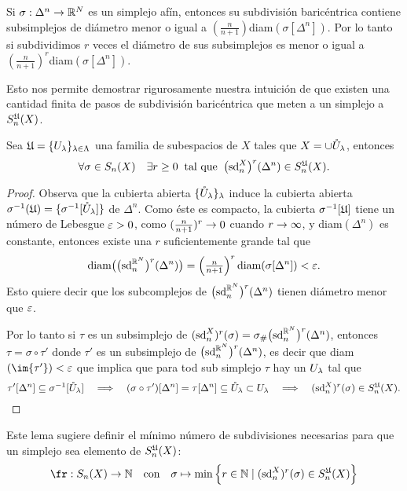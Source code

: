 \documentclass[../../topologia_algebraica]{subfiles}
\begin{document}
Si $\sigma:\Delta^n\rightarrow\mathbb{R}^N$ es un simplejo af\'in, entonces su subdivisi\'on baric\'entrica
contiene subsimplejos de di\'ametro menor o igual a $(\tfrac{n}{n+1})$diam$(\sigma[\Delta^n])$.
Por lo tanto si subdividimos $r$ veces el di\'ametro de sus subsimplejos es menor o igual
a $(\tfrac{n}{n+1})^r$diam$(\sigma[\Delta^n])$.

Esto nos permite demostrar rigurosamente nuestra intuici\'on de que existen una cantidad
finita de pasos de subdivisi\'on baric\'entrica que meten a un simplejo a $S_{n}^{\mathfrak{U}}(X)$.

\begin{lema}
  Sea $\mathfrak{U}=\{U_{\lambda}\}_{\lambda\in\Lambda}$ una familia de subespacios de $X$ tales que
  $X=\cup \mathring{U}_{\lambda}$, entonces
  \[
    \forall \sigma\in S_n(X) \quad\exists r\geq0\;\;\text{tal que}\;\;
    \big(\text{sd}^X_n\big)^r(\Delta^n)\in S_n^{\mathfrak{U}}(X).
  \]
\end{lema}
\begin{proof}
  Observa que la cubierta abierta $\{\mathring{U}_{\lambda}\}_{\lambda}$ induce la cubierta abierta
  $\sigma^{-1}(\mathfrak{U})=\{\sigma^{-1}[\mathring{U}_{\lambda}]\}$ de $\Delta^n$. Como \'este es
  compacto, la cubierta $\sigma^{-1}[\mathfrak{U}]$ tiene un n\'umero de Lebesgue $\varepsilon>0$, como
  $(\tfrac{n}{n+1})^r\rightarrow0$ cuando $r\rightarrow\infty$, y diam$(\Delta^n)$ es constante, entonces
  existe una $r$ suficientemente grande tal que
  \[
    \text{diam}\big( \big(\text{sd}^{\mathbb{R}^N}_n\big)^r(\Delta^n)\big)=
    \left( \tfrac{n}{n+1} \right)^r\text{diam}(\sigma[\Delta^n])<\varepsilon.
  \]
  Esto quiere decir que los subcomplejos de $\big(\text{sd}^{\mathbb{R}^N}_n\big)^r(\Delta^n)$
  tienen di\'ametro menor que $\varepsilon$.

  Por lo tanto si $\tau$ es un subsimplejo de
  $(\text{sd}^X_n)^r(\sigma)=\sigma_{\#}\big(\text{sd}^{\mathbb{R}^N}_n\big)^r(\Delta^n)$, entonces
  $\tau=\sigma\circ\tau'$ donde $\tau'$ es un subsimplejo de
  $\big(\text{sd}^{\mathbb{R}^N}_n\big)^r(\Delta^n)$, es decir que diam$(\im{\tau'})<\eps$ que
  implica que para tod sub simplejo  $\tau$ hay un $U_{\lambda}$ tal que
  \[
    \tau'[\Delta^n]\subseteq\sigma^{-1}[\mathring{U}_{\lambda}] \quad\Longrightarrow\quad
    (\sigma\circ\tau')[\Delta^n]=\tau[\Delta^n]\subseteq \mathring{U}_{\lambda}\subset U_{\lambda} \quad\Longrightarrow\quad
    (\text{sd}^X_n)^r(\sigma)\in S_n^{\mathfrak{U}}(X).
  \]
\end{proof}

Este lema sugiere definir el m\'inimo n\'umero de subdivisiones necesarias para que un
simplejo sea elemento de $S_n^{\mathfrak{U}}(X)$:
\[
  \fr:S_n(X)\ra\NN \quad\text{con}\quad
  \sigma\mapsto\min\Big\{r\in\NN\mid (\text{sd}^X_n)^r(\sigma)\in S_n^{\fU}(X)\Big\}
\]
\end{document}
